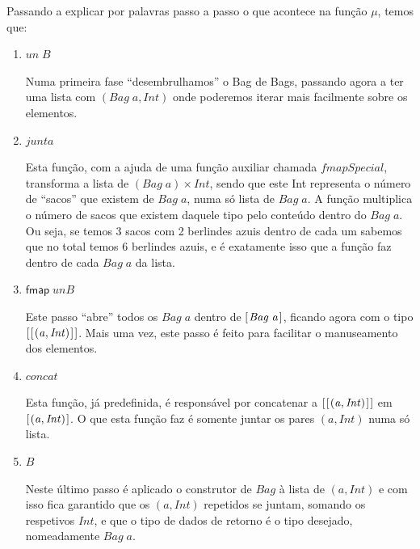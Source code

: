 \documentclass[a4paper]{article}
\newcommand{\Conid}[1]{\mathit{#1}}
\newcommand{\Varid}[1]{\mathit{#1}}
\begin{document}
Passando a explicar por palavras passo a passo
o que acontece na função \ensuremath{\mu }, temos que:
\begin{enumerate}
\item \ensuremath{\Varid{un}\;\mathit B}

Numa primeira fase ``desembrulhamos'' o Bag de Bags, passando agora
a ter uma lista com \ensuremath{(\Conid{Bag}\;\Varid{a},\Conid{Int})} onde poderemos iterar mais facilmente
sobre os elementos.

\item \ensuremath{\Varid{junta}}

Esta função, com a ajuda de uma função auxiliar chamada \ensuremath{\Varid{fmapSpecial}},
transforma a lista de \ensuremath{(\Conid{Bag}\;\Varid{a})\times\Conid{Int}}, sendo que este Int
representa o número de ``sacos'' que existem de \ensuremath{\Conid{Bag}\;\Varid{a}}, numa só lista de \ensuremath{\Conid{Bag}\;\Varid{a}}.
A função multiplica o número de sacos que existem daquele tipo pelo conteúdo
dentro do \ensuremath{\Conid{Bag}\;\Varid{a}}. Ou seja, se temos 3 sacos com 2 berlindes azuis
dentro de cada um sabemos que no total temos 6 berlindes azuis, e é exatamente
isso que a função faz dentro de cada \ensuremath{\Conid{Bag}\;\Varid{a}} da lista.

\item \ensuremath{\mathsf{fmap}\;\Varid{unB}}

Este passo ``abre'' todos os \ensuremath{\Conid{Bag}\;\Varid{a}} dentro de \ensuremath{[\mskip1.5mu \Conid{Bag}\;\Varid{a}\mskip1.5mu]}, ficando agora
com o tipo \ensuremath{[\mskip1.5mu [\mskip1.5mu (\Varid{a},\Conid{Int})\mskip1.5mu]\mskip1.5mu]}. Mais uma vez, este passo é feito
para facilitar o manuseamento dos elementos.

\item \ensuremath{\Varid{concat}}

Esta função, já predefinida, é responsável por concatenar a \ensuremath{[\mskip1.5mu [\mskip1.5mu (\Varid{a},\Conid{Int})\mskip1.5mu]\mskip1.5mu]}
em \ensuremath{[\mskip1.5mu (\Varid{a},\Conid{Int})\mskip1.5mu]}. O que esta função faz é somente juntar os pares \ensuremath{(\Varid{a},\Conid{Int})}
numa só lista.

\item \ensuremath{\mathit B}

Neste último passo é aplicado o construtor de \ensuremath{\Conid{Bag}} à lista de \ensuremath{(\Varid{a},\Conid{Int})} e com
isso fica garantido que os \ensuremath{(\Varid{a},\Conid{Int})} repetidos se juntam, somando
os respetivos \ensuremath{\Conid{Int}}, e que o tipo
de dados de retorno é o tipo desejado, nomeadamente \ensuremath{\Conid{Bag}\;\Varid{a}}.

\end{enumerate}
\end{document}
